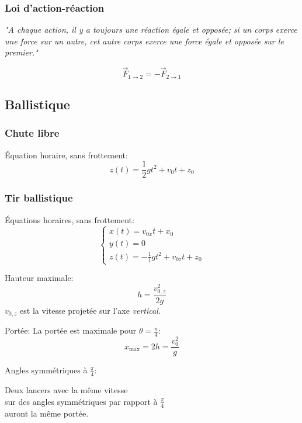 \documentclass{article}
\numberwithin{equation}{section}
\begin{document}
\subsubsection{Loi d'action-réaction} \label{sec:actionreaction}
\begin{center}
	\emph{"A chaque action, il y a toujours une réaction égale et opposée; si un corps exerce une force sur un autre, cet autre corps exerce une force égale et opposée sur le premier."}
\end{center}
\begin{equation}
	\boxed{\vec F_{1 \to 2} = - \vec F_{2 \to 1}}
\end{equation}

\subsection{Ballistique}
\subsubsection{Chute libre}
Équation horaire, sans frottement:
\begin{equation}
	\boxed{z(t) = \frac{1}{2} gt^2 + v_0t + z_0}
\end{equation}

\subsubsection{Tir ballistique}
Équations horaires, sans frottement:
\begin{equation}
	\boxed{\begin{cases}
		x(t) = v_{0x}t + x_0 \\
		y(t) = 0 \\
		z(t) = -\frac{1}{1}gt^2 + v_{0z}t + z_0
	\end{cases}}
\end{equation}

Hauteur maximale:
\begin{equation}
	\boxed{h = \dfrac{v_{0,z}^2}{2g}}
\end{equation}
\(v_{0,z}\) est la vitesse projetée sur l'axe \emph{vertical}.

Portée:
La portée est maximale pour \(\theta = \frac{\pi}{4}\):
\begin{equation}
	x_{\text{max}} = 2h = \dfrac{v_0^2}{g}
\end{equation}

Angles symmétriques à \(\frac{\pi}{4}\):
\begin{center}
	Deux lancers avec la même vitesse \\ sur des angles symmétriques par rapport à \(\frac{\pi}{4}\) \\ auront la même portée.
\end{center}
\end{document}
